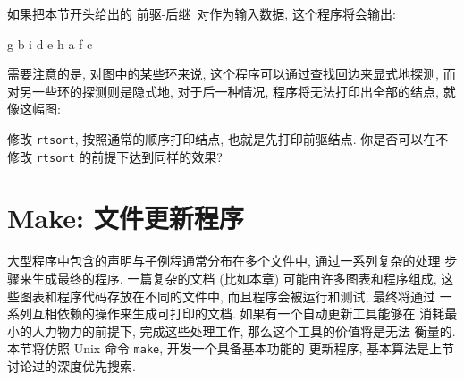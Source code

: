 如果把本节开头给出的 \mbox{前驱}-后继\ 对作为输入数据, 这个程序将会输出:
\begin{shell}
    g b i d e h a f c
\end{shell}
需要注意的是, 对图中的某些环来说, 这个程序可以通过查找回边来显式地探测,
而对另一些环的探测则是隐式地, 对于后一种情况, 程序将无法打印出全部的结点,
就像这幅图:
\begin{center}
\end{center}

\begin{exercise}
    修改 \texttt{rtsort}, 按照通常的顺序打印结点, 也就是先打印前驱结点.
    你是否可以在不修改 \texttt{rtsort} 的前提下达到同样的效果?
\end{exercise}

\section{Make: 文件更新程序}
\label{sec:make_a_file_updating_program}

大型程序中包含的声明与子例程通常分布在多个文件中, 通过一系列复杂的处理
步骤来生成最终的程序. 一篇复杂的文档 (比如本章) 可能由许多图表和程序组成,
这些图表和程序代码存放在不同的文件中, 而且程序会被运行和测试, 最终将通过
一系列互相依赖的操作来生成可打印的文档. 如果有一个自动更新工具能够在
消耗最小的人力物力的前提下, 完成这些处理工作, 那么这个工具的价值将是无法
衡量的. 本节将仿照 Unix 命令 \texttt{make}, 开发一个具备基本功能的
更新程序, 基本算法是上节讨论过的深度优先搜索.

